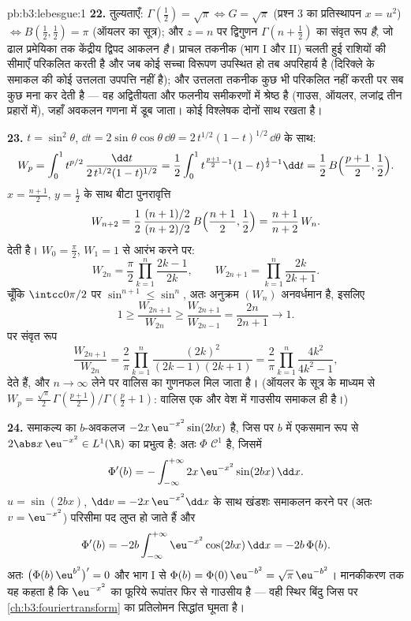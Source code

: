 \begin{solution}{pb:b3:lebesgue:1}
\textbf{22.} तुल्यताएँ: $\Gamma(\frac12) = \sqrt\pi
\Leftrightarrow G = \sqrt\pi$ (प्रश्न 3 का प्रतिस्थापन $x = u^2$) $\Leftrightarrow B(\frac12, \frac12) = \pi$
(ऑयलर का सूत्र); और $z = n$ पर द्विगुणन $\Gamma(n + \frac12)$ का संवृत रूप \emph{है},
जो ढाल प्रमेयिका तक केंद्रीय द्विपद आकलन \emph{है}। प्राचल तकनीक
(भाग I और II) चलती हुई राशियों की सीमाएँ परिकलित करती है और जब कोई
सच्चा विरूपण उपस्थित हो तब अपरिहार्य है (दिरिक्ले के समाकल की कोई
उत्तलता उपपत्ति नहीं है); और उत्तलता तकनीक कुछ भी परिकलित नहीं करती
पर सब कुछ मना कर देती है --- वह अद्वितीयता और फलनीय समीकरणों में
श्रेष्ठ है (गाउस, ऑयलर, लजांद्र तीन प्रहारों में), जहाँ अवकलन गणना
में डूब जाता। कोई  विश्लेषक दोनों साथ रखता है।

\textbf{23.} $t = \sin^2\theta$, $\dd t =
2\sin\theta\cos\theta\,\dd\theta =
2\,t^{1/2}(1-t)^{1/2}\,\dd\theta$ के साथ:
\[
W_p = \int_0^1 t^{p/2}\,
\frac{\dd t}{2\,t^{1/2}(1-t)^{1/2}}
= \frac12\int_0^1 t^{\frac{p+1}2 - 1}(1-t)^{\frac12 - 1}\dd t
= \frac12\,B\Bigl(\frac{p+1}2, \frac12\Bigr).
\]
$x = \frac{n+1}2$, $y = \frac12$ के साथ बीटा पुनरावृत्ति
\[
W_{n+2} = \frac12\,
\frac{(n+1)/2}{(n+2)/2}\,B\Bigl(\frac{n+1}2, \frac12\Bigr)
= \frac{n+1}{n+2}\,W_n .
\]
देती है। $W_0 = \frac\pi2$, $W_1 = 1$ से आरंभ करने पर:
\[
W_{2n} = \frac\pi2\prod_{k=1}^n\frac{2k-1}{2k},
\qquad
W_{2n+1} = \prod_{k=1}^n\frac{2k}{2k+1} .
\]
चूँकि $\intcc0{\pi/2}$ पर $\sin^{n+1} \leq \sin^n$, अतः अनुक्रम $(W_n)$ अनवर्धमान है, इसलिए
\[
1 \geq \frac{W_{2n+1}}{W_{2n}} \geq
\frac{W_{2n+1}}{W_{2n-1}} = \frac{2n}{2n+1}
\longrightarrow 1 .
\]
पर संवृत रूप
\[
\frac{W_{2n+1}}{W_{2n}} = \frac2\pi
\prod_{k=1}^n\frac{(2k)^2}{(2k-1)(2k+1)}
= \frac2\pi\prod_{k=1}^n\frac{4k^2}{4k^2-1},
\]
देते हैं, और $n \to \infty$ लेने पर वालिस का गुणनफल मिल जाता है। (ऑयलर के
सूत्र के माध्यम से $W_p = \frac{\sqrt\pi}2\,
\Gamma(\frac{p+1}2)/\Gamma(\frac p2 + 1)$: वालिस एक और वेश में गाउसीय समाकल ही है।)

\textbf{24.} समाकल्य का $b$-अवकलज $-2x\,\eu^{-x^2}\sin(2bx)$ है, जिस पर $b$ में एकसमान
रूप से $2\abs
x\,\eu^{-x^2} \in L^1(\R)$ का प्रभुत्व है: अतः $\Phi$ $\mathcal C^1$ है, जिसमें
\[
\Phi'(b) = -\int_{-\infty}^{+\infty}
2x\,\eu^{-x^2}\sin(2bx)\,\dd x .
\]
$u = \sin(2bx)$, $\dd v =
-2x\,\eu^{-x^2}\dd x$ के साथ खंडशः समाकलन करने पर (अतः $v = \eu^{-x^2}$) परिसीमा पद लुप्त
हो जाते हैं और
\[
\Phi'(b) = -2b\int_{-\infty}^{+\infty}
\eu^{-x^2}\cos(2bx)\,\dd x = -2b\,\Phi(b).
\]
अतः $\bigl(\Phi(b)\,\eu^{b^2}\bigr)' = 0$ और भाग I से $\Phi(b) =
\Phi(0)\,\eu^{-b^2} = \sqrt\pi\,\eu^{-b^2}$। मानकीकरण तक यह कहता है कि $\eu^{-x^2}$ का
फूरिये रूपांतर फिर से गाउसीय है --- वही स्थिर बिंदु जिस पर \cref{ch:b3:fouriertransform} का
प्रतिलोमन सिद्धांत घूमता है।


\end{solution}
